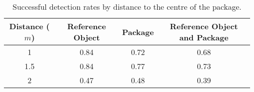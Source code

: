 \begin{table}
\centering
\begin{tabular}{@{} *4c @{}}
\toprule
 \multicolumn{1}{c}{Distance ($m$)} & Reference Object  & Package  & Reference Object and Package  \\ 
\midrule
 1 	& 0.84 & 0.72 & 0.68 \\ 
 1.5 & 0.84 & 0.77 & 0.73 \\
 2 	& 0.47 & 0.48 & 0.39 \\
\bottomrule
 \end{tabular}
 \caption{Successful detection rates by distance to the centre of the package.}
\label{table:detection_by_distance}
\end{table}